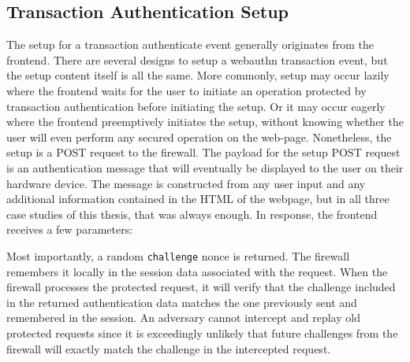 \subsection{Transaction Authentication Setup}\label{Sec:TransactionAuthenticationSetup}


The setup for a transaction authenticate event generally originates from the frontend. There are several designs to setup a webauthn transaction event, but the setup content itself is all the same. More commonly, setup may occur lazily where the frontend waits for the user to initiate an operation protected by transaction authentication before initiating the setup. Or it may occur eagerly where the frontend preemptively initiates the setup, without knowing whether the user will even perform any secured operation on the web-page. Nonetheless, the setup is a POST request to the firewall. The payload for the setup POST request is an authentication message that will eventually be displayed to the user on their hardware device. The message is constructed from any user input and any additional information contained in the HTML of the webpage, but in all three case studies of this thesis, that was always enough. In response, the frontend receives a few parameters:



Most importantly, a random \lstinline{challenge} nonce is returned. The firewall remembers it locally in the session data associated with the request. When the firewall processes the protected request, it will verify that the challenge included in the returned authentication data matches the one previously sent and remembered in the session. An adversary cannot intercept and replay old protected requests since it is exceedingly unlikely that future challenges from the firewall will exactly match the challenge in the intercepted request. 

